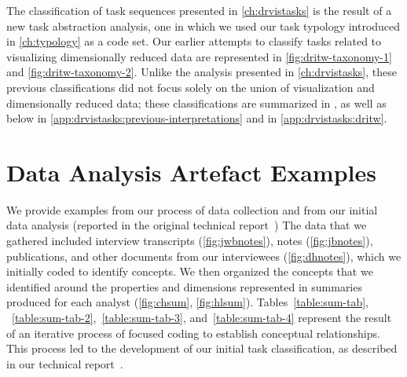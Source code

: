 The classification of task sequences presented in \autoref{ch:drvistasks} is the result of a new task abstraction analysis, one in which we used our task typology introduced in \autoref{ch:typology} as a code set.
Our earlier attempts to classify tasks related to visualizing dimensionally reduced data are represented in \autoref{fig:dritw-taxonomy-1} and \autoref{fig:dritw-taxonomy-2}. 
Unlike the analysis presented in \autoref{ch:drvistasks}, these previous classifications did not focus solely on the union of visualization and dimensionally reduced data; these classifications are summarized in \citet{Sedlmair2012b}, as well as below in \autoref{app:drvistasks:previous-interpretations} and in \autoref{app:drvistasks:dritw}.



\section{Data Analysis Artefact Examples}
\label{app:drvistasks:analysis-examples}


We provide examples from our process of data collection and from our initial data analysis (reported in the original technical report~\cite{Sedlmair2012b})
The data that we gathered included interview transcripts (\eg \autoref{fig:jwbnotes}), notes (\eg \autoref{fig:jbnotes}), publications, and other documents from our interviewees (\eg \autoref{fig:dhnotes}), which we initially coded to identify concepts.
We then organized the concepts that we identified around the properties and dimensions represented in summaries produced for each analyst (\eg \autoref{fig:chsum}, \autoref{fig:hlsum}).
Tables~\ref{table:sum-tab}, ~\ref{table:sum-tab-2},~\ref{table:sum-tab-3}, and~\ref{table:sum-tab-4} represent the result of an iterative process of focused coding to establish conceptual relationships. 
This process led to the development of our initial task classification, as described in our technical report~\cite{Sedlmair2012b}.

